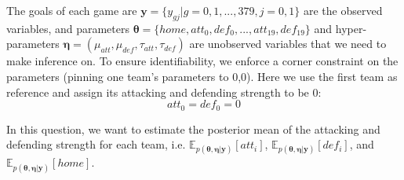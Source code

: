 \documentclass[10pt]{article}
\begin{document}
The goals of each game are $\mathbf{y} = \{ y_{gj} | g=0,1,...,379, j=0,1 \}$ are the observed variables, and parameters $\boldsymbol{\theta} = \{ home, att_0, def_0, ..., att_{19}, def_{19} \}$ and hyper-parameters $\boldsymbol{\eta} = (\mu_{att}, \mu_{def}, \tau_{att}, \tau_{def})$ are unobserved variables that we need to make inference on. To ensure identifiability, we enforce a corner constraint on the parameters (pinning one team’s parameters to 0,0). Here we use the first team as reference and assign its attacking and defending strength to be 0:
\begin{equation}
att_0 = def_0 = 0
\end{equation}

In this question, we want to estimate the posterior mean of the attacking and defending strength for each team, i.e. $\mathbb{E}_{p(\boldsymbol{\theta},\boldsymbol{\eta}|\mathbf{y})} [att_i]$, $\mathbb{E}_{p(\boldsymbol{\theta},\boldsymbol{\eta}|\mathbf{y})} [def_i]$, and $\mathbb{E}_{p(\boldsymbol{\theta},\boldsymbol{\eta}|\mathbf{y})} [home]$.
\end{document}
